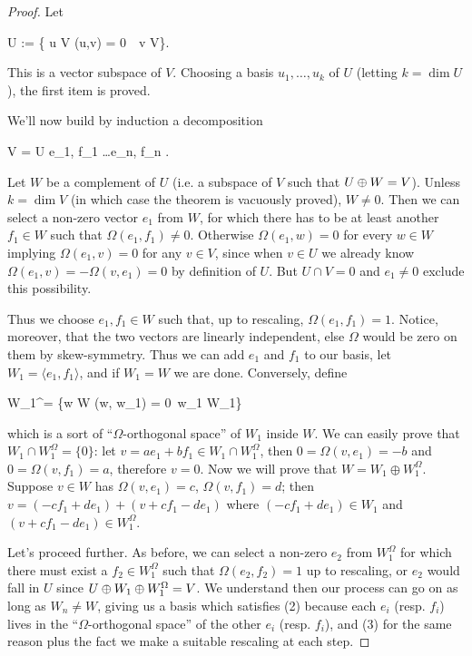 \documentclass[main.tex]{subfiles}
\begin{document}
\begin{proof}
	Let
	\begin{eqalign}
		U := \{ u \in V \suchthat \Omega(u,v) = 0\ \forall\, v \in V\}.
	\end{eqalign}
	This is a vector subspace of $V$. Choosing a basis $u_1, \dots, u_k$ of $U$ (letting $k = \dim U$), the first item is proved.

	We'll now build by induction a decomposition
	\begin{eqalign}
	\label{eq:symp_decomp}
		V = U \dir \langle e_1, f_1 \rangle \dir \ldots \langle e_n, f_n \rangle.
	\end{eqalign}
	Let $W$ be a complement of $U$ (i.e. a subspace of $V$ such that $U \oplus W = V$). Unless $k=\dim V$ (in which case the theorem is vacuously proved), $W \neq 0$. Then we can select a non-zero vector $e_1$ from $W$, for which there has to be at least another $f_1 \in W$ such that $\Omega(e_1, f_1) \neq 0$. Otherwise $\Omega(e_1, w) = 0$ for every $w \in W$ implying $\Omega(e_1, v) = 0$ for any $v \in V$, since when $v \in U$ we already know $\Omega(e_1, v) = -\Omega(v, e_1) = 0$ by definition of $U$. But $U \cap V = 0$ and $e_1 \neq 0$ exclude this possibility.

	Thus we choose $e_1, f_1 \in W$ such that, up to rescaling, $\Omega(e_1, f_1) = 1$. Notice, moreover, that the two vectors are linearly independent, else $\Omega$ would be zero on them by skew-symmetry. 
	Thus we can add $e_1$ and $f_1$ to our basis, let $W_1 = \langle e_1, f_1 \rangle$, and if $W_1 = W$ we are done. Conversely, define
	\begin{eqalign}
		W_1^\Omega = \{w \in W \suchthat \Omega(w, w_1) = 0\ \forall w_1 \in W_1\}
	\end{eqalign}
	which is a sort of ``$\Omega$-orthogonal space'' of $W_1$ inside $W$. We can easily prove that $W_1\cap W_1^\Omega=\{0\}$: let $v=ae_1+bf_1\in W_1\cap W_1^\Omega$, then $0=\Omega(v,e_1)=-b$ and $0=\Omega(v,f_1)=a$, therefore $v=0$. 
	Now we will prove that $W=W_1\oplus W_1^\Omega$. Suppose $v\in W$ has $\Omega(v,e_1)=c$, $\Omega(v,f_1)=d$; then $v=(-cf_1+de_1)+(v+cf_1-de_1)$ where $(-cf_1+de_1)\in W_1$ and $(v+cf_1-de_1)\in W_1^\Omega$. 
	
	Let's proceed further. As before, we can select a non-zero $e_2$ from $W_1^\Omega$ for which there must exist a $f_2 \in W_1^\Omega$ such that $\Omega(e_2, f_2) = 1$ up to rescaling, or $e_2$ would fall in $U$ since $U \oplus W_1 \oplus W_1^\Omega = V$. We understand then our process can go on as long as $W_n \neq W$, giving us a basis which satisfies (2) because each $e_i$ (resp. $f_i$) lives in the ``$\Omega$-orthogonal space'' of the other $e_i$ (resp. $f_i$), and (3) for the same reason plus the fact we make a suitable rescaling at each step.
\end{proof}
\end{document}
